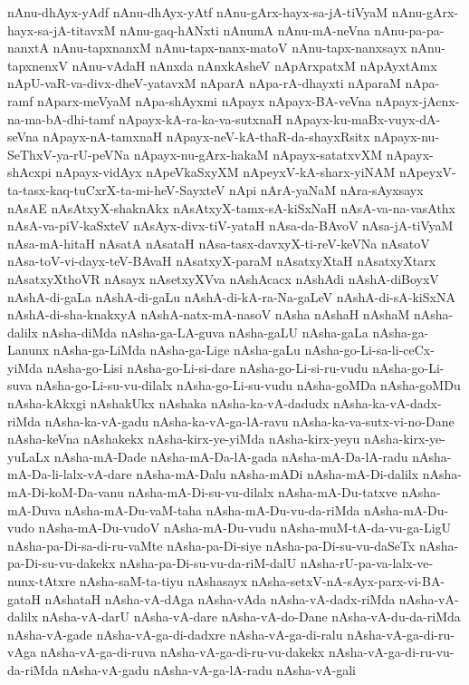 {nAnu-dhAyx-yAdf
nAnu-dhAyx-yAtf
nAnu-gArx-hayx-sa-jA-tiVyaM
nAnu-gArx-hayx-sa-jA-titavxM
nAnu-gaq-hANxti
nAnumA
nAnu-mA-neVna
nAnu-pa-pa-nanxtA
nAnu-tapxnanxM
nAnu-tapx-nanx-matoV
nAnu-tapx-nanxsayx
nAnu-tapxnenxV
nAnu-vAdaH
nAnxda
nAnxkAsheV
nApArxpatxM
nApAyxtAmx
nApU-vaR-va-divx-dheV-yatavxM
nAparA
nApa-rA-dhayxti
nAparaM
nApa-ramf
nAparx-meVyaM
nApa-shAyxmi
nApayx
nApayx-BA-veVna
nApayx-jAcnx-na-ma-bA-dhi-tamf
nApayx-kA-ra-ka-va-sutxnaH
nApayx-ku-maBx-vuyx-dA-seVna
nApayx-nA-tamxnaH
nApayx-neV-kA-thaR-da-shayxRsitx
nApayx-nu-SeThxV-ya-rU-peVNa
nApayx-nu-gArx-hakaM
nApayx-satatxvXM
nApayx-shAcxpi
nApayx-vidAyx
nApeVkaSxyXM
nApeyxV-kA-sharx-yiNAM
nApeyxV-ta-tasx-kaq-tuCxrX-ta-mi-heV-SayxteV
nApi
nArA-yaNaM
nAra-sAyxsayx
nAsAE
nAsAtxyX-shaknAkx
nAsAtxyX-tamx-sA-kiSxNaH
nAsA-va-na-vasAthx
nAsA-va-piV-kaSxteV
nAsAyx-divx-tiV-yataH
nAsa-da-BAvoV
nAsa-jA-tiVyaM
nAsa-mA-hitaH
nAsatA
nAsataH
nAsa-tasx-davxyX-ti-reV-keVNa
nAsatoV
nAsa-toV-vi-dayx-teV-BAvaH
nAsatxyX-paraM
nAsatxyXtaH
nAsatxyXtarx
nAsatxyXthoVR
nAsayx
nAsetxyXVva
nAshAcacx
nAshAdi
nAshA-diBoyxV
nAshA-di-gaLa
nAshA-di-gaLu
nAshA-di-kA-ra-Na-gaLeV
nAshA-di-sA-kiSxNA
nAshA-di-sha-knakxyA
nAshA-natx-mA-nasoV
nAsha
nAshaH
nAshaM
nAsha-dalilx
nAsha-diMda
nAsha-ga-LA-guva
nAsha-gaLU
nAsha-gaLa
nAsha-ga-Lanunx
nAsha-ga-LiMda
nAsha-ga-Lige
nAsha-gaLu
nAsha-go-Li-sa-li-ceCx-yiMda
nAsha-go-Lisi
nAsha-go-Li-si-dare
nAsha-go-Li-si-ru-vudu
nAsha-go-Li-suva
nAsha-go-Li-su-vu-dilalx
nAsha-go-Li-su-vudu
nAsha-goMDa
nAsha-goMDu
nAsha-kAkxgi
nAshakUkx
nAshaka
nAsha-ka-vA-dadudx
nAsha-ka-vA-dadx-riMda
nAsha-ka-vA-gadu
nAsha-ka-vA-ga-lA-ravu
nAsha-ka-va-sutx-vi-no-Dane
nAsha-keVna
nAshakekx
nAsha-kirx-ye-yiMda
nAsha-kirx-yeyu
nAsha-kirx-ye-yuLaLx
nAsha-mA-Dade
nAsha-mA-Da-lA-gada
nAsha-mA-Da-lA-radu
nAsha-mA-Da-li-lalx-vA-dare
nAsha-mA-Dalu
nAsha-mADi
nAsha-mA-Di-dalilx
nAsha-mA-Di-koM-Da-vanu
nAsha-mA-Di-su-vu-dilalx
nAsha-mA-Du-tatxve
nAsha-mA-Duva
nAsha-mA-Du-vaM-taha
nAsha-mA-Du-vu-da-riMda
nAsha-mA-Du-vudo
nAsha-mA-Du-vudoV
nAsha-mA-Du-vudu
nAsha-muM-tA-da-vu-ga-LigU
nAsha-pa-Di-sa-di-ru-vaMte
nAsha-pa-Di-siye
nAsha-pa-Di-su-vu-daSeTx
nAsha-pa-Di-su-vu-dakekx
nAsha-pa-Di-su-vu-da-riM-dalU
nAsha-rU-pa-va-lalx-ve-nunx-tAtxre
nAsha-saM-ta-tiyu
nAshasayx
nAsha-setxV-nA-sAyx-parx-vi-BA-gataH
nAshataH
nAsha-vA-dAga
nAsha-vAda
nAsha-vA-dadx-riMda
nAsha-vA-dalilx
nAsha-vA-darU
nAsha-vA-dare
nAsha-vA-do-Dane
nAsha-vA-du-da-riMda
nAsha-vA-gade
nAsha-vA-ga-di-dadxre
nAsha-vA-ga-di-ralu
nAsha-vA-ga-di-ru-vAga
nAsha-vA-ga-di-ruva
nAsha-vA-ga-di-ru-vu-dakekx
nAsha-vA-ga-di-ru-vu-da-riMda
nAsha-vA-gadu
nAsha-vA-ga-lA-radu
nAsha-vA-gali
}
